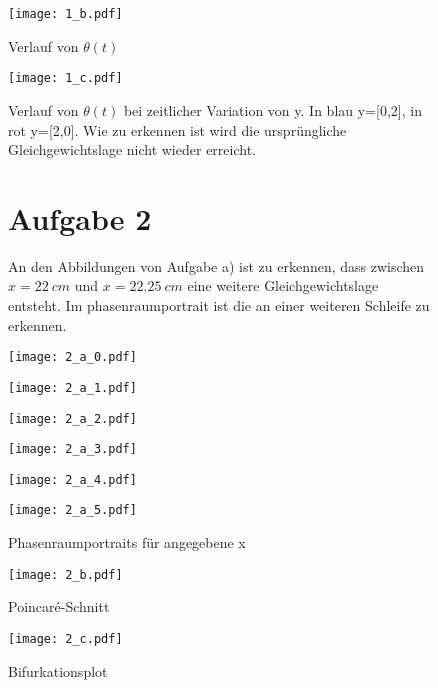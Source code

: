 \documentclass[paper=a4, ngerman]{scrartcl}
\begin{document}
\begin{figure}[htbp]
	\centering
	\texttt{[image: 1\_b.pdf]}
	\caption{Verlauf von $\theta(t)$}
	\label{fig:1b}
\end{figure}

\begin{figure}[htbp]
	\centering
	\texttt{[image: 1\_c.pdf]}
	\caption{Verlauf von $\theta(t)$ bei zeitlicher Variation von y. In blau y=[0,2], in rot y=[2,0]. Wie zu erkennen ist wird die ursprüngliche  Gleichgewichtslage nicht wieder erreicht.}
	\label{fig:1c}
\end{figure}

\begin{figure}[htbp]
\section{Aufgabe 2}
An den Abbildungen von Aufgabe a) ist zu erkennen, dass zwischen $x=\SI{22}{cm}$ und $x=\SI{22.25}{cm}$ eine weitere Gleichgewichtslage entsteht. Im phasenraumportrait ist die an einer weiteren Schleife zu erkennen.\\[.5cm]

    \centering
    \begin{minipage}{.49\linewidth}
        \centering
        \texttt{[image: 2\_a\_0.pdf]}
    \end{minipage}
    \begin{minipage}{.49\linewidth}
        \centering
        \texttt{[image: 2\_a\_1.pdf]}
    \end{minipage}
    \begin{minipage}{.49\linewidth}
        \centering
        \texttt{[image: 2\_a\_2.pdf]}
    \end{minipage}
    \begin{minipage}{.49\linewidth}
        \centering
        \texttt{[image: 2\_a\_3.pdf]}
    \end{minipage}
    \begin{minipage}{.49\linewidth}
        \centering
        \texttt{[image: 2\_a\_4.pdf]}
    \end{minipage}
    \begin{minipage}{.49\linewidth}
        \centering
        \texttt{[image: 2\_a\_5.pdf]}
    \end{minipage}
    \caption{Phasenraumportraits für angegebene x}
\end{figure} 

\begin{figure}[htbp]
	\centering
	\texttt{[image: 2\_b.pdf]}
	\caption{Poincaré-Schnitt}
	\label{fig:poin}
\end{figure}

\begin{figure}[htbp]
	\centering
	\texttt{[image: 2\_c.pdf]}
	\caption{Bifurkationsplot}
	\label{fig:label}
\end{figure}
\end{document}
